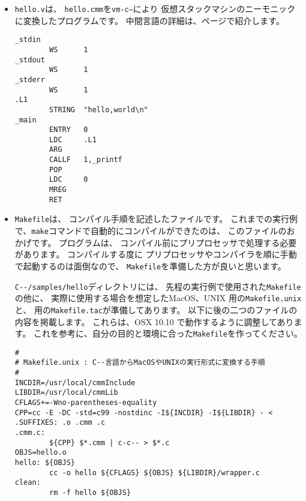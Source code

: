 \begin{itemize}
\begin{mylist}
\begin{verbatim}
_stdin  WS      1
_stdout WS      1
_stderr WS      1
.L1     STRING  "hello,world\n"
_main   PUSH    FP
        LD      FP,SP
        CALL    __stkChk
        LD      G0,#.L1
        PUSH    G0
        CALL    _printf
        ADD     SP,#2
        LD      G0,#0
        POP     FP
        RET
\end{verbatim}
\end{mylist}

\item {\tt hello.v}は、
\verb/hello.cmm/を{\tt vm-c--}により
仮想スタックマシンのニーモニックに変換したプログラムです。
中間言語の詳細は、\pageref{app:vm}ページで紹介します。

\begin{mylist}
\begin{verbatim}
_stdin
        WS      1
_stdout
        WS      1
_stderr
        WS      1
.L1
        STRING  "hello,world\n"
_main
        ENTRY   0
        LDC     .L1
        ARG
        CALLF   1,_printf
        POP
        LDC     0
        MREG
        RET
\end{verbatim}
\end{mylist}

\item {\tt Makefile}は、
コンパイル手順を記述したファイルです。
これまでの実行例で、{\tt make}コマンドで自動的にコンパイルができたのは、
このファイルのおかげです。
\cmm プログラムは、
コンパイル前にプリプロセッサで処理する必要があります。
コンパイルする度に
プリプロセッサやコンパイラを順に手動で起動するのは面倒なので、
{\tt Makefile}を準備した方が良いと思います。

\verb;C--/samples/hello;ディレクトリには、
先程の実行例で使用された{\tt Makefile}の他に、
実際に使用する場合を想定したMacOS、UNIX 用の{\tt Makefile.unix}と、
\tacos 用の{\tt Makefile.tac}が準備してあります。
以下に後の二つのファイルの内容を掲載します。
これらは、OSX 10.10 で動作するように調整してあります。
これを参考に、自分の目的と環境に合った{\tt Makefile}を作ってください。

\begin{mylist}
\begin{verbatim}
#
# Makefile.unix : C--言語からMacOSやUNIXの実行形式に変換する手順
#
INCDIR=/usr/local/cmmInclude
LIBDIR=/usr/local/cmmLib
CFLAGS+=-Wno-parentheses-equality
CPP=cc -E -DC -std=c99 -nostdinc -I${INCDIR} -I${LIBDIR} - < 
.SUFFIXES: .o .cmm .c
.cmm.c:
        ${CPP} $*.cmm | c-c-- > $*.c
OBJS=hello.o
hello: ${OBJS}
        cc -o hello ${CFLAGS} ${OBJS} ${LIBDIR}/wrapper.c
clean:
        rm -f hello ${OBJS}
\end{verbatim}
\end{mylist}


\end{itemize}
